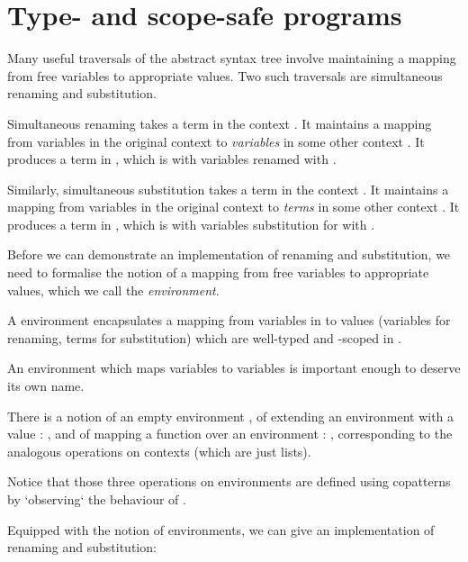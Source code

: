 \documentclass[bsc,frontabs,twoside,singlespacing,parskip,deptreport]{infthesis}
\theoremstyle{definition}
\begin{document}
\section{Type- and scope-safe programs}

Many useful traversals of the abstract syntax tree involve maintaining
a mapping from free variables to appropriate values. Two such
traversals are simultaneous renaming and substitution.

Simultaneous renaming takes a term  in the context . It maintains
a mapping  from variables in the original context  to
\textit{variables} in some other context . It produces a term in
, which is  with variables renamed with .

Similarly, simultaneous substitution takes a term  in the context
. It maintains a mapping  from variables in the original context
 to \textit{terms} in some other context . It produces a
term in , which is  with variables substitution for with .

Before we can demonstrate an implementation of renaming and
substitution, we need to formalise the notion of a mapping from free
variables to appropriate values, which we call the
\textit{environment}.


A environment  encapsulates a mapping from variables in
 to values  (variables for renaming, terms for
substitution) which are well-typed and -scoped in .

An environment which maps variables to variables is important enough
to deserve its own name.


There is a notion of an empty environment , of extending an
environment  with a value : , and of mapping a
function  over an environment : ,
corresponding to the analogous operations on contexts (which are just
lists).


Notice that those three operations on environments are defined using
copatterns \cite{DBLP:conf/popl/AbelPTS13} by `observing` the
behaviour of .

Equipped with the notion of environments, we can give an
implementation of renaming and substitution:
\end{document}
